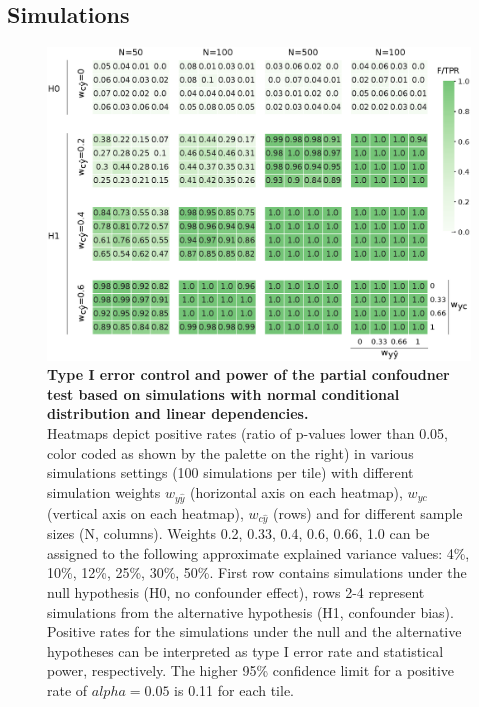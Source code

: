 \documentclass{article}
\begin{document}
\subsection{Simulations}

\begin{figure}[!b]
  \centering
  \includegraphics[width=0.75\paperwidth]{fig/sim_normal.eps}
  \caption{\textbf{Type I error control and power of the partial confoudner test based on simulations with normal conditional distribution and linear dependencies.} \\
  Heatmaps depict positive rates (ratio of p-values lower than 0.05, color coded as shown by the palette on the right) in various simulations settings (100 simulations per tile) with different simulation weights $w_{y\hat{y}}$ (horizontal axis on each heatmap), $w_{yc}$ (vertical axis on each heatmap), $w_{c\hat{y}}$ (rows) and for different sample sizes (N, columns). Weights 0.2, 0.33, 0.4, 0.6, 0.66, 1.0 can be assigned to the following approximate explained variance values: 4\%, 10\%, 12\%, 25\%, 30\%, 50\%. First row contains simulations under the null hypothesis (H0, no confounder effect), rows 2-4 represent simulations from the alternative hypothesis (H1, confounder bias).
  Positive rates for the simulations under the null and the alternative hypotheses can be interpreted as type I error rate and statistical power, respectively. The higher 95\% confidence limit for a positive rate of $alpha=0.05$ is 0.11 for each tile.
  }
  \label{fig:sim-normal}
\end{figure}
\end{document}
